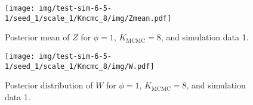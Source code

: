 \documentclass[12pt]{article} %
\begin{document}
\begin{figure}[h]
  \begin{center}
    \texttt{[image: img/test-sim-6-5-1/seed\_1/scale\_1/Kmcmc\_8/img/Zmean.pdf]}
  \end{center}
  \caption{Posterior mean of $Z$ for $\phi=1$, $K_\text{MCMC}=8$, and
  simulation data 1.}
  \label{fig:kmcmc8-scale1-zmean}
\end{figure}

\begin{figure}[h]
  \begin{center}
    \texttt{[image: img/test-sim-6-5-1/seed\_1/scale\_1/Kmcmc\_8/img/W.pdf]}
  \end{center}
  \caption{Posterior distribution of $W$ for $\phi=1$, $K_\text{MCMC}=8$, and
  simulation data 1.}
  \label{fig:kmcmc8-scale1-w}
\end{figure}
\end{document}
